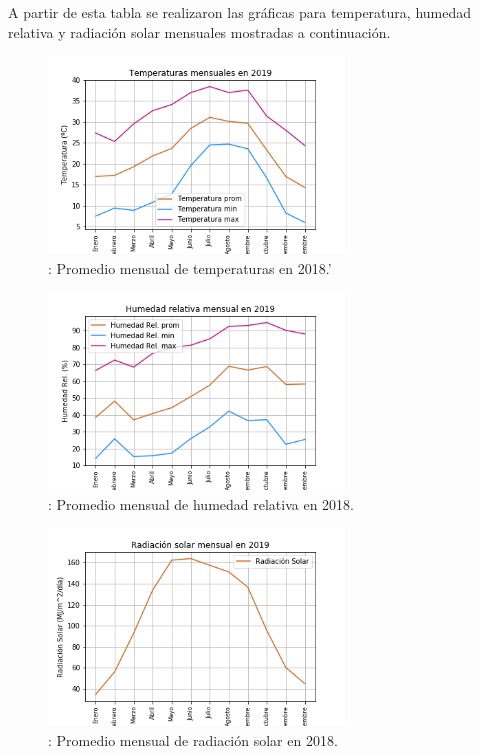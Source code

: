 \documentclass[letterpaper,12pt]{article}
\begin{document}
A partir de esta tabla se realizaron las gráficas para temperatura, humedad relativa y radiación solar mensuales mostradas a continuación.

\begin{figure}[H]
\centering
\includegraphics[width=0.7\textwidth]{T_2019.png}
\caption{\label{fig:graf2}: Promedio mensual de temperaturas en 2018.'}
\end{figure}

\begin{figure}[H]
\centering
\includegraphics[width=0.7\textwidth]{HR_2019.png}
\caption{\label{fig:graf3}: Promedio mensual de humedad relativa en 2018.}
\end{figure}

\begin{figure}[H]
\centering
\includegraphics[width=0.7\textwidth]{Rs_2019.png}
\caption{\label{fig:graf1}: Promedio mensual de radiación solar en 2018. }
\end{figure}
\end{document}
